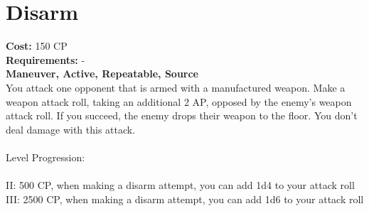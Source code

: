 \section{Disarm}
\textbf{Cost:} 150 CP\\
\textbf{Requirements:} -\\
\textbf{Maneuver, Active, Repeatable, Source}\\
You attack one opponent that is armed with a manufactured weapon. Make a weapon attack roll, taking an additional 2 AP, opposed by the enemy's weapon attack roll. If you succeed, the enemy drops their weapon to the floor. You don't deal damage with this attack.\\
\\
Level Progression:\\
\\
II: 500 CP, when making a disarm attempt, you can add 1d4 to your attack roll\\ 
III: 2500 CP, when making a disarm attempt, you can add 1d6 to your attack roll\\